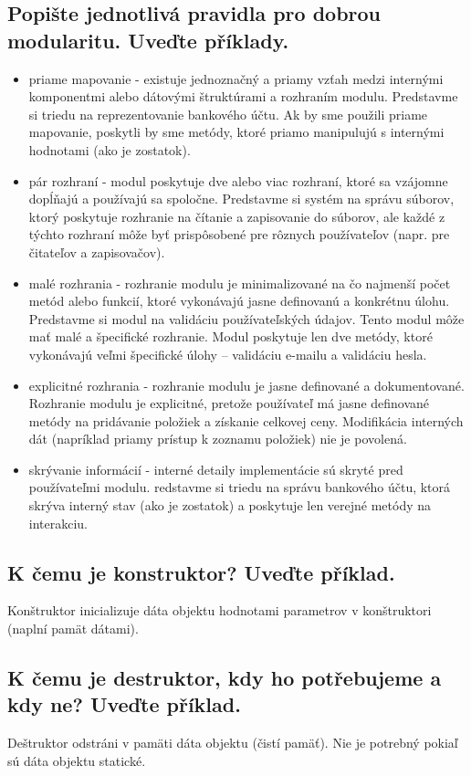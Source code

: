 \subsection{Popište jednotlivá pravidla pro dobrou modularitu. Uveďte příklady.}
\begin{itemize}
    \item priame mapovanie - existuje jednoznačný a priamy vzťah medzi internými komponentmi alebo dátovými štruktúrami a rozhraním modulu. Predstavme si triedu na reprezentovanie bankového účtu. Ak by sme použili priame mapovanie, poskytli by sme metódy, ktoré priamo manipulujú s internými hodnotami (ako je zostatok).
    \item pár rozhraní - modul poskytuje dve alebo viac rozhraní, ktoré sa vzájomne dopĺňajú a používajú sa spoločne. Predstavme si systém na správu súborov, ktorý poskytuje rozhranie na čítanie a zapisovanie do súborov, ale každé z týchto rozhraní môže byť prispôsobené pre rôznych používateľov (napr. pre čitateľov a zapisovačov).
    \item malé rozhrania - rozhranie modulu je minimalizované na čo najmenší počet metód alebo funkcií, ktoré vykonávajú jasne definovanú a konkrétnu úlohu. Predstavme si modul na validáciu používateľských údajov. Tento modul môže mať malé a špecifické rozhranie. Modul poskytuje len dve metódy, ktoré vykonávajú veľmi špecifické úlohy – validáciu e-mailu a validáciu hesla.
    \item explicitné rozhrania - rozhranie modulu je jasne definované a dokumentované. Rozhranie modulu je explicitné, pretože používateľ má jasne definované metódy na pridávanie položiek a získanie celkovej ceny. Modifikácia interných dát (napríklad priamy prístup k zoznamu položiek) nie je povolená.
    \item skrývanie informácií - interné detaily implementácie sú skryté pred používateľmi modulu. redstavme si triedu na správu bankového účtu, ktorá skrýva interný stav (ako je zostatok) a poskytuje len verejné metódy na interakciu.
\end{itemize}


\subsection{K čemu je konstruktor? Uveďte příklad.}
Konštruktor inicializuje dáta objektu hodnotami parametrov v konštruktori (naplní pamät dátami).


\subsection{K čemu je destruktor, kdy ho potřebujeme a kdy ne? Uveďte příklad.}
Deštruktor odstráni v pamäti dáta objektu (čistí pamäť). Nie je potrebný pokiaľ sú dáta objektu statické.
